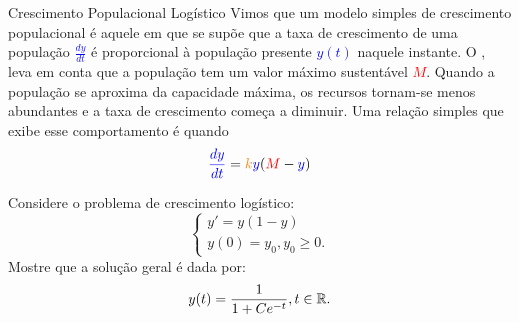 \begin{frame}{Crescimento Populacional Logístico}
	Vimos que um modelo simples de crescimento populacional é aquele em que se supõe que a taxa de crescimento de uma população \textcolor{blue}{$\frac{dy}{dt}$} é proporcional à população presente \textcolor{blue}{$y(t)$} naquele instante.	O , leva em conta que a população tem um valor máximo sustentável \textcolor{red}{$M$}. Quando a população se aproxima da capacidade máxima, os recursos tornam-se menos abundantes e a taxa de crescimento começa a diminuir. Uma relação simples  que exibe esse comportamento é quando 
	\[\textcolor{blue}{\frac{dy}{dt}}={\color{orange}k}\textcolor{blue}{y}(\textcolor{red}{M}-\textcolor{blue}{y}) \]
	
	
\end{frame}

\begin{frame}{ }


\begin{exe}
Considere o problema de crescimento logístico:
	\[\begin{cases}
y'=y(1-y)\\
y(0)=y_0, y_0\geq 0.
\end{cases}
\]
Mostre que a solução geral é dada por:
\[y(t)=\frac{1}{1+Ce^{-t}}, t\in \mathbb{R}.\]
\end{exe}


\end{frame}

